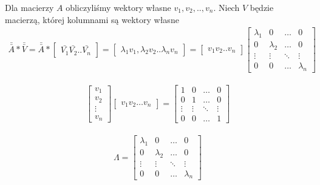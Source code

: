\documentclass[a4paper,12pt]{article}
\theoremstyle{definition}%
\theoremstyle{definition}
\theoremstyle{problem}
\begin{document}
Dla macierzy $A$ obliczyliśmy wektory własne $v_1, v_2, ..,v_n$. Niech $V$ będzie macierzą, której kolumnami są wektory własne
\begin{align*}
\bar{\bar{A}}*\bar{\bar{V}}=\bar{\bar{A}}*\begin{bmatrix}
\bar{V_1}\bar{V_2}..\bar{V_n}
\end{bmatrix} = \begin{bmatrix}
\lambda _1 v_1,\lambda _2 v_2..\lambda _n v_n
\end{bmatrix}=
\begin{bmatrix}
v_1v_2..v_n
\end{bmatrix}\begin{bmatrix}
\lambda _1 & 0 & \dots & 0\\
0 &\lambda _2 & \dots & 0\\
\vdots & \vdots & \ddots & \vdots \\
0 & 0 & \dots & \lambda _n
\end{bmatrix}
\end{align*}

\begin{align*}
\begin{bmatrix}
v_1\\v_2\\\vdots\\v_n
\end{bmatrix}\begin{bmatrix}
v_1v_2\dots v_n
\end{bmatrix}=\begin{bmatrix}
1 &0 &\dots & 0\\
0 & 1 & \dots &0\\
\vdots & \vdots & \ddots &\vdots \\
0 & 0 & \dots & 1
\end{bmatrix}
\end{align*}


\begin{align*}
\Lambda = \begin{bmatrix}
\lambda _1 & 0 & \dots & 0\\
0 & \lambda _2 & \dots & 0\\
\vdots & \vdots &\ddots & \vdots \\
0 & 0 & \dots & \lambda _n
\end{bmatrix}
\end{align*}
\end{document}
